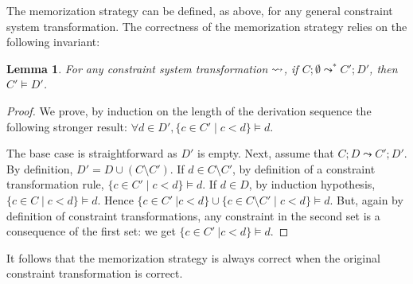 \documentclass[acmtocl,acmnow]{acmtrans2m}
\newtheorem{lemma}[theorem]{Lemma}
\begin{document}
The memorization strategy can be defined, as above,
 for any general constraint system transformation.
 The correctness of the memorization strategy
relies on the following invariant:

\begin{lemma}\label{lemma:redundancy}
For any  constraint system transformation $\leadsto$, if $C;\emptyset \leadsto^* C'; D'$, then $C' \models D'$.
\end{lemma}

\begin{proof}
We prove, by induction on the length of the derivation sequence the following
stronger  result: $\forall d\in D',  \{c\in C'\mid c < d\} \models d$.

The base case is straightforward as $D'$ is empty. Next, assume that
$C; D \leadsto C'; D'$. By definition, $D'= D \cup (C \setminus C')$. If
$d\in C\setminus C'$, by definition of a constraint transformation rule,
$\{c\in C'\mid c< d\} \models d$. If $d\in D$, by induction hypothesis,
$\{c\in C\mid c < d\} \models d$. Hence $\{c\in C'\: | c < d\} \cup \{c\in C\setminus C' \mid c< d\} \models d$. But, again by definition of constraint transformations, any constraint in the second set is a consequence of the first set:
we get $\{c\in C'\: | c< d\} \models d$. 
\end{proof}

It follows that the memorization strategy is always correct when the
original constraint transformation is correct.
\end{document}

